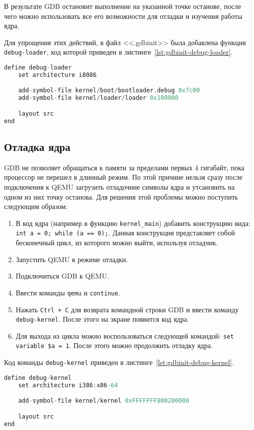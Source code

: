В результате GDB остановит выполнение на
указанной точке останове, после чего можно использовать все его возможности для отладки и изучения работы ядра.

Для упрощения этих действий, в файл <<.gdbinit>> была добавлена функция \texttt{debug-loader}, код
которой приведен в листинге~\ref{lst:gdbinit-debug-loader}.

\begin{lstlisting}[language=C, caption={Реализация команды <<debug-loader>>}, label={lst:gdbinit-debug-loader}]
define debug-loader
	set architecture i8086

	add-symbol-file kernel/boot/bootloader.debug 0x7c00
	add-symbol-file kernel/loader/loader 0x100000

	layout src
end
\end{lstlisting}

\subsection{Отладка ядра}
GDB не позволяет обращаться к памяти за пределами первых 4 гигабайт, пока процессор не перешел в длинный
режим. По этой причине нельзя сразу после подключения к QEMU загрузить отладочние символы ядра и утсановить
на одном из них точку останова. Для решения этой проблемы можно поступить следующим образом:
\begin{enumerate}[1.]
	\item В код ядра (например в функцию \texttt{kernel\_main}) добавить конструкцию вида:
		\texttt{int a = 0; while (a == 0);}. Данная конструкция представляет собой
		бесконечный цикл, из которого можно выйти, используя отладчик.
	\item Запустить QEMU в режиме отладки.
	\item Подключиться GDB к QEMU.
	\item Ввести команды \texttt{qemu} и \texttt{continue}.
	\item Нажать \texttt{Ctrl + C} для возврата командной строки GDB и ввести команду \texttt{debug-kernel}.
		После этого на экране появится код ядра.
	\item Для выхода из цикла можно воспользоваться следующей командой: \texttt{set variable \$a = 1}.
		После этого можно продолжить отладку ядра.
\end{enumerate}

Код команды \texttt{debug-kernel} приведен в листинге~\ref{lst:gdbinit-debug-kernel}.
\begin{lstlisting}[language=C, caption={Реализация команды <<debug-kernel>>}, label={lst:gdbinit-debug-kernel}]
define debug-kernel
	set architecture i386:x86-64

	add-symbol-file kernel/kernel 0xFFFFFFF800200000

	layout src
end
\end{lstlisting}

